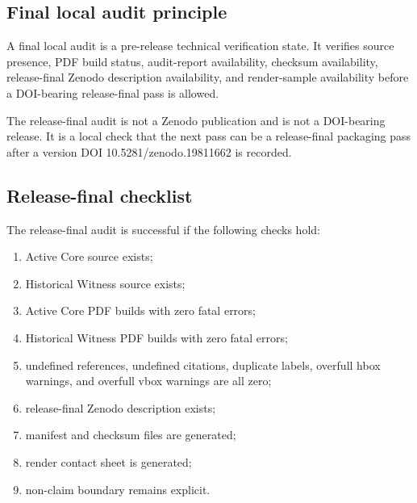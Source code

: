 \subsection{Final local audit principle}
\label{subsec:v4016-final-local-audit-principle}

\begin{definition}
\label{def:v4016-final-local-audit-principle}
A final local audit is a pre-release technical verification state. It verifies
source presence, PDF build status, audit-report availability, checksum
availability, release-final Zenodo description availability, and render-sample
availability before a DOI-bearing release-final pass is allowed.
\end{definition}

\begin{remark}
\label{rem:v4016-release-final-does-not-publish}
The release-final audit is not a Zenodo publication and is not a DOI-bearing release. It
is a local check that the next pass can be a release-final packaging pass after
a version DOI 10.5281/zenodo.19811662 is recorded.
\end{remark}

\subsection{Release-final checklist}
\label{subsec:v4016-release-final-release-final-checklist}

\begin{definition}
\label{def:v4016-release-final-release-final-checklist}
The release-final audit is successful if the following checks hold:
\begin{enumerate}[leftmargin=*]
 \item Active Core source exists;
 \item Historical Witness source exists;
 \item Active Core PDF builds with zero fatal errors;
 \item Historical Witness PDF builds with zero fatal errors;
 \item undefined references, undefined citations, duplicate labels, overfull
 hbox warnings, and overfull vbox warnings are all zero;
 \item release-final Zenodo description exists;
 \item manifest and checksum files are generated;
 \item render contact sheet is generated;
 \item non-claim boundary remains explicit.
\end{enumerate}
\end{definition}

